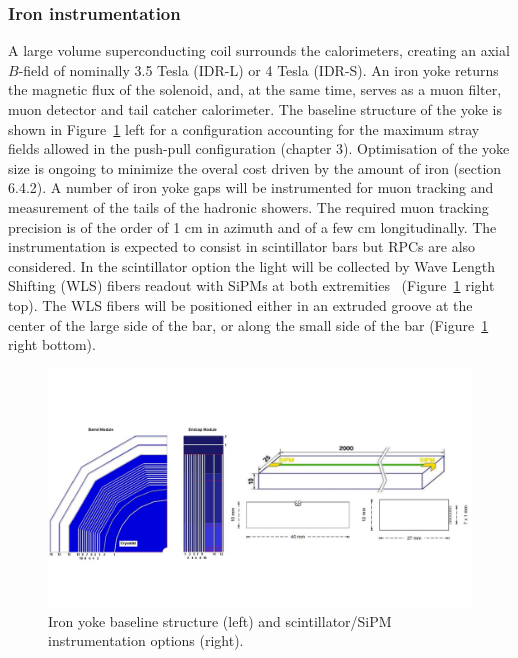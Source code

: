 \vspace{1cm}
\subsubsection*{\bf Iron instrumentation}

A large volume superconducting coil surrounds the calorimeters, creating an axial $B$-field of nominally 3.5 Tesla (IDR-L) or 4 Tesla (IDR-S). An iron yoke returns the magnetic flux of the solenoid, and, at the same time, serves as a muon filter, muon detector and tail catcher calorimeter. The baseline structure of the yoke is shown in Figure~\ref{fig:det:yoke} left for a configuration accounting for the maximum stray fields allowed in the push-pull configuration (chapter 3). Optimisation of the yoke size is ongoing to minimize the overal cost driven by the amount of iron (section 6.4.2). A number of iron yoke gaps will be instrumented for muon tracking and measurement of the tails of the hadronic showers. The required muon tracking precision is of the order of 1 cm in azimuth and of a few cm longitudinally. The instrumentation is expected to consist in scintillator bars but RPCs are also considered. In the scintillator option the light will be collected by Wave Length Shifting (WLS) fibers readout with SiPMs at both extremities~\cite{SavelievSiPM} (Figure~\ref{fig:det:yoke} right top). The WLS fibers will be positioned either in an extruded groove at the center of the large side of the bar, or along the small side of the bar (Figure~\ref{fig:det:yoke} right bottom).  


\begin{figure}[t!]
\centering
\includegraphics[width=1.0\hsize]{Detector/fig/Iron_instrumentation.jpg}
\caption{Iron yoke baseline structure (left) and scintillator/SiPM instrumentation options (right).}
\label{fig:det:yoke}
\end{figure}

